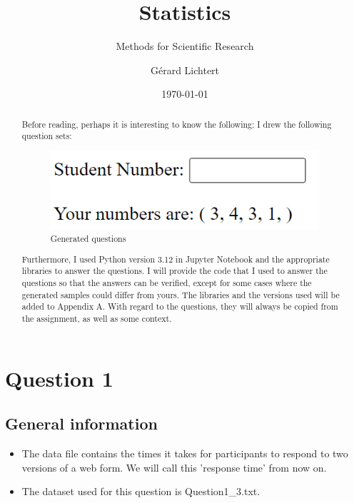 \documentclass[a4paper]{article}
\title{Statistics}
\subtitle{Methods for Scientific Research}
\author{Gérard Lichtert}
\date{\today}
\begin{document}
\maketitle
\begin{abstract}
Before reading, perhaps it is interesting to know the following: I drew the following question sets:
    \begin{figure}[H]
        \centering
        \includegraphics[width=0.3\linewidth]{images/Screenshot 2023-12-02 025750.png}
        \caption{Generated questions}
        \label{fig:qs}
    \end{figure}
Furthermore, I used Python version 3.12 in Jupyter Notebook and the appropriate libraries to answer the questions. I will provide the code that I used to answer the questions so that the answers can be verified, except for some cases where the generated samples could differ from yours. The libraries and the versions used will be added to Appendix A. With regard to the questions, they will always be copied from the assignment, as well as some context.
\end{abstract}
\newpage
\tableofcontents
\newpage
\section{Question 1}
\subsection{General information}
\begin{itemize}
    \item The data file contains the times it takes for participants to respond to two versions of a web form. We will call this 'response time' from now on.
    \item The dataset used for this question is Question1\_3.txt. 
\end{itemize}
\end{document}
